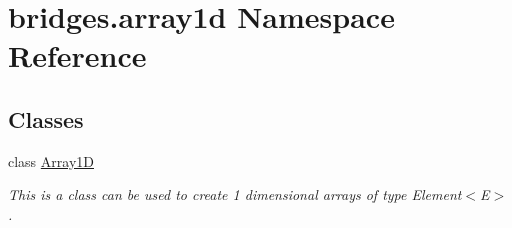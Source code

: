 \hypertarget{namespacebridges_1_1array1d}{}\section{bridges.\+array1d Namespace Reference}
\label{namespacebridges_1_1array1d}
\subsection*{Classes}
\begin{DoxyCompactItemize}
\item 
class \mbox{\hyperlink{classbridges_1_1array1d_1_1_array1_d}{Array1D}}
\begin{DoxyCompactList}\small\item\em This is a class can be used to create 1 dimensional arrays of type Element$<$\+E$>$. \end{DoxyCompactList}\end{DoxyCompactItemize}
